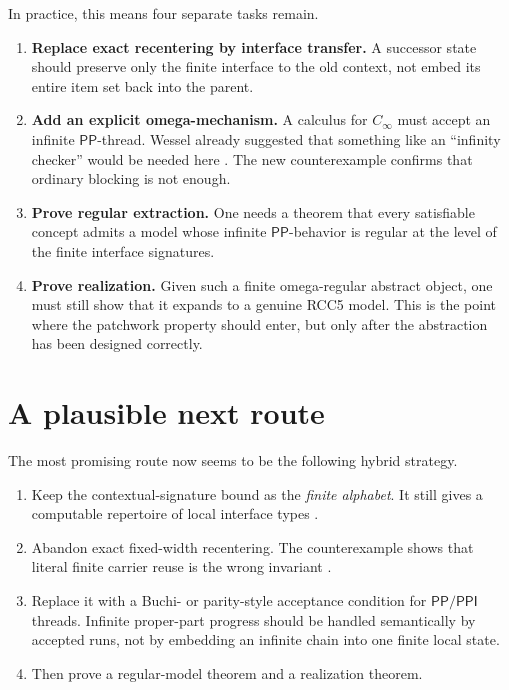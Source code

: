 \documentclass[11pt]{article}
\newcommand{\Pp}{\mathsf{PP}}
\newcommand{\Ppi}{\mathsf{PPI}}
\begin{document}
In practice, this means four separate tasks remain.

\begin{enumerate}
\item \textbf{Replace exact recentering by interface transfer.}
A successor state should preserve only the finite interface to the old context, not embed its entire item set back into the parent.

\item \textbf{Add an explicit omega-mechanism.}
A calculus for $C_\infty$ must accept an infinite $\Pp$-thread. Wessel already suggested that something like an ``infinity checker'' would be needed here \cite[p.~49]{Wessel2003}. The new counterexample confirms that ordinary blocking is not enough.

\item \textbf{Prove regular extraction.}
One needs a theorem that every satisfiable concept admits a model whose infinite $\Pp$-behavior is regular at the level of the finite interface signatures.

\item \textbf{Prove realization.}
Given such a finite omega-regular abstract object, one must still show that it expands to a genuine RCC5 model. This is the point where the patchwork property should enter, but only after the abstraction has been designed correctly.
\end{enumerate}

\section{A plausible next route}

The most promising route now seems to be the following hybrid strategy.

\begin{enumerate}
\item Keep the contextual-signature bound as the \emph{finite alphabet}. It still gives a computable repertoire of local interface types \cite{GPT2026Bound}.
\item Abandon exact fixed-width recentering. The counterexample shows that literal finite carrier reuse is the wrong invariant \cite{Claude2026FW}.
\item Replace it with a Buchi- or parity-style acceptance condition for $\Pp/\Ppi$ threads. Infinite proper-part progress should be handled semantically by accepted runs, not by embedding an infinite chain into one finite local state.
\item Then prove a regular-model theorem and a realization theorem.
\end{enumerate}
\end{document}
